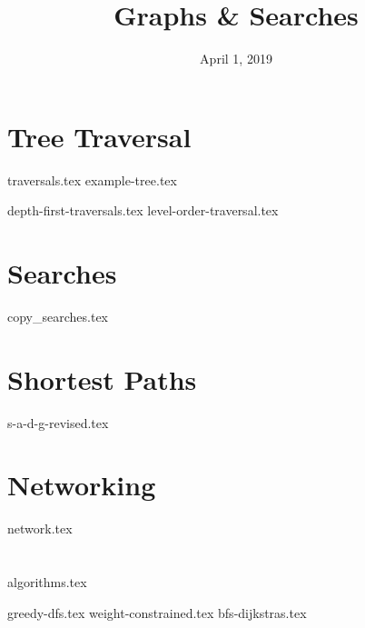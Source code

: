 \documentclass[11pt]{exam}
\title{Graphs \& Searches}
\date{April 1, 2019}
\begin{document}
\maketitle

\section{Tree Traversal}

{traversals.tex}
{example-tree.tex}
\begin{questions}
{depth-first-traversals.tex}
{level-order-traversal.tex}

\end{questions}

\section{Searches}
\begin{questions}
{copy_searches.tex}
\end{questions}

\clearpage

\section{Shortest Paths}
\begin{questions}
{s-a-d-g-revised.tex}
\end{questions}

\clearpage

\section{Networking}
\begin{questions}
{network.tex}
\end{questions}

\clearpage

\section{}
{algorithms.tex}
\begin{questions}
{greedy-dfs.tex}
{weight-constrained.tex}
{bfs-dijkstras.tex}
\end{questions}
\end{document}
